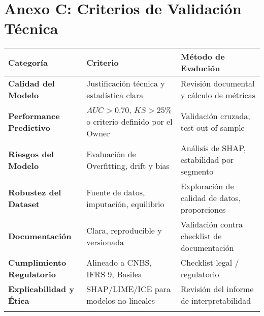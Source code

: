 \documentclass[11pt,oneside]{article}%
\begin{document}
\section{Anexo C: Criterios de Validación Técnica}
\begin{longtable}{>{\bfseries}p{4.7cm} p{4cm} p{7.3cm}}
\toprule
\rowcolor{ficoblue}
\color{white}\textbf{Categoría}  &\color{white}\textbf{Criterio}& \color{white}\textbf{Método de Evalución } \\
 \midrule
Calidad del Modelo           & Justificación técnica y estadística clara & Revisión documental y cálculo de métricas \\ 
\addlinespace
Performance Predictivo  & $AUC>0.70$, $KS>25\%$ o criterio definido por el Owner & Validación cruzada, test out-of-sample\\
\addlinespace
Riesgos del Modelo  & Evaluación de Overfitting, drift y bias & Análisis de SHAP, estabilidad por segmento \\
\addlinespace
Robustez del Dataset & Fuente de datos, imputación, equilibrio & Exploración de calidad de datos, proporciones \\ 
\addlinespace
Documentación & Clara, reproducible y versionada & Validación contra checklist de documentación \\ 
\addlinespace
Cumplimiento Regulatorio & Alineado a CNBS, IFRS 9, Basilea & Checklist legal / regulatorio \\ 
\addlinespace
Explicabilidad y Ética & SHAP/LIME/ICE para modelos no lineales & Revisión del informe de interpretabilidad \\
\addlinespace
\bottomrule
\end{longtable}
\newpage
\end{document}
